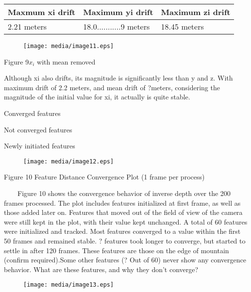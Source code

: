 \begin{table}[h]
\centering
\begin{tabular}{|l|l|l|}
\hline
Maxmum xi drift & Maximum yi drift & Maximum zi drift \\
\hline
2.21 meters & 18.0...........9 meters & 18.45 meters \\
\hline
\end{tabular}
\end{table}


\begin{figure}[h]
\centering
\texttt{[image: media/image11.eps]}
\end{figure}


\begin{center}Figure 9$x_{i}$ with mean removed\end{center}

Although xi also drifts, its magnitude is significantly less than y and 
z. With maximum drift of 2.2 meters, and mean drift of ?meters, 
considering the magnitude of the initial value for xi, it actually is 
quite stable. 

Converged features

Not converged features

Newly initiated features

\begin{figure}[h]
\centering
\texttt{[image: media/image12.eps]}
\end{figure}


\begin{center}Figure 10 Feature Distance Convergence Plot (1 frame per 
process)\end{center}

\ \ \ \ Figure 10 shows the convergence behavior of inverse depth over 
the 200 frames processed. The plot includes features initialized at 
first frame, as well as those added later on. Features that moved out of 
the field of view of the camera were still kept in the plot, with their 
value kept unchanged. A total of 60 features were initialized and 
tracked. Most features converged to a value within the first 50 frames 
and remained stable. ? features took longer to converge, but started to 
settle in after 120 frames. These features are those on the edge of 
mountain (confirm required).Some other features (? Out of 60) never show 
any convergence behavior. What are these features, and why they don't 
converge?

\begin{figure}[h]
\centering
\texttt{[image: media/image13.eps]}
\end{figure}


